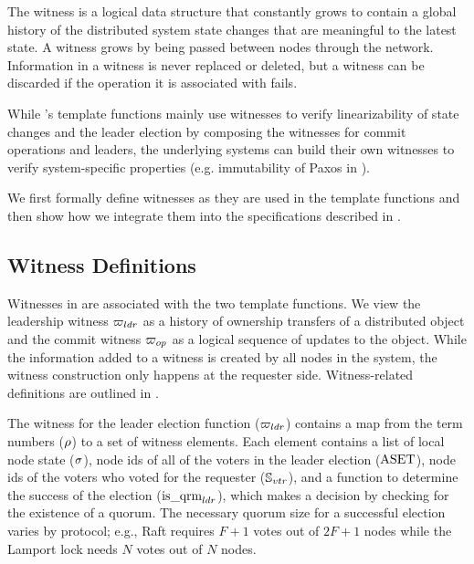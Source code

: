 The witness is a logical data structure that constantly grows to contain a global
history of the distributed system state changes that are meaningful to the
latest state. A witness grows by being passed between nodes through the network.
Information in a witness is never replaced or deleted, but a witness can
be discarded if the operation it is associated with fails.


While \sysname{}'s template functions mainly use witnesses to verify
linearizability of state changes and the leader election by composing the 
witnesses for commit operations and leaders, the underlying systems can
build their own witnesses to verify system-specific properties (e.g. immutability
of Paxos in ).

We first formally define witnesses as they are used in the template functions
and then show how we integrate them into the specifications described in .

\subsection{Witness Definitions} 
\label{subsec:witness-definition}
Witnesses in \sysname{} are associated with the two template functions.
We view the leadership witness ${\varpi_{ldr}}$ as a history of ownership transfers
of a distributed object and the commit witness ${\varpi_{op}}$ as
a logical sequence of updates to the object. While the information added to a
witness is created by all nodes in the system, the witness construction only
happens at the requester side. Witness-related definitions are outlined in
.

The witness for the leader election function (${\varpi_{ldr}}$) contains a map
from the term numbers ($\rho$) to a set of witness elements.
Each element contains a list of local node state ($\sigma$), node ids
of all of the voters in the leader election ($\mathrm{ASET}$), node ids of the voters who voted
for the requester ($\mathbb{S}_{vtr}$), and a function to determine the success of the
election ($\mathrm{is}\_\mathrm{qrm}_{ldr}$), which makes a decision by checking for the existence of a
quorum. The necessary quorum size for a successful election varies
by protocol; e.g., Raft requires $F + 1$ votes out of $2F + 1$
nodes while the Lamport lock needs $N$ votes out of $N$ nodes.

